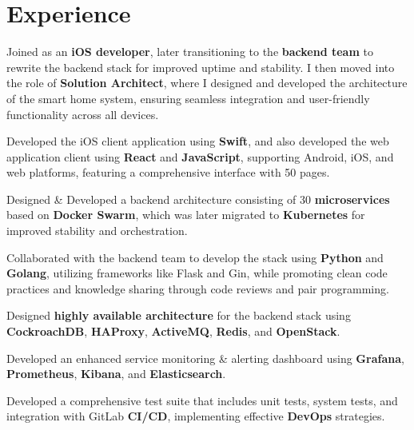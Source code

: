 \documentclass[letterpaper]{deedy-resume} %
\begin{document}
\hfill
%
%
\begin{minipage}[t]{0.66\textwidth} %


\section{Experience}


\vspace{\topsep} %
\begin{tightitemize}
\item Joined as an {\bf iOS developer}, later transitioning to the {\bf backend team} to rewrite the backend stack for improved uptime and stability. I then moved into the role of {\bf Solution Architect}, where I designed and developed the architecture of the smart home system, ensuring seamless integration and user-friendly functionality across all devices.
\item Developed the iOS client application using {\bf Swift}, and also developed the web application client using {\bf React} and {\bf JavaScript}, supporting Android, iOS, and web platforms, featuring a comprehensive interface with 50 pages.
\item Designed \& Developed a backend architecture consisting of 30 {\bf microservices} based on {\bf Docker Swarm}, which was later migrated to {\bf Kubernetes} for improved stability and orchestration.
\item Collaborated with the backend team to develop the stack using {\bf Python} and {\bf Golang}, utilizing frameworks like Flask and Gin, while promoting clean code practices and knowledge sharing through code reviews and pair programming.
\item Designed {\bf highly available architecture} for the backend stack using {\bf CockroachDB}, {\bf HAProxy}, {\bf ActiveMQ}, {\bf Redis}, and {\bf OpenStack}.
\item Developed an enhanced service monitoring \& alerting dashboard using {\bf Grafana}, {\bf Prometheus}, {\bf Kibana}, and {\bf Elasticsearch}.
\item Developed a comprehensive test suite that includes unit tests, system tests, and integration with GitLab {\bf CI/CD}, implementing effective {\bf DevOps} strategies.


\end{tightitemize}
\end{minipage}
\end{document}
